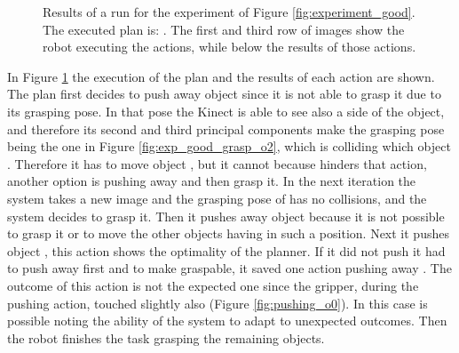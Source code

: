\begin{figure}
\caption{Results of a run for the experiment of Figure \ref{fig:experiment_good}. The executed plan is:  
. The first and third row of images show the robot executing the actions, while below the results of those actions.}\label{fig:execution_experiment}
\end{figure}

In Figure \ref{fig:execution_experiment} the execution of the plan and the results of each action are shown. The plan first decides to push away object  since it is not able to grasp it due to its grasping pose. In that pose the Kinect is able to see also a side of the object, and therefore its second and third principal components make the grasping pose being the one in Figure \ref{fig:exp_good_grasp_o2}, which is colliding which object . Therefore it has to move object , but it cannot because  hinders that action, another option is pushing away  and then grasp it. In the next iteration the system takes a new image and the grasping pose of  has no collisions, and the system decides to grasp it. Then it pushes away object  because it is not possible to grasp it or to move the other objects having  in such a position. Next it pushes object , this action shows the optimality of the planner. If it did not push  it had to push away first  and  to make  graspable, it saved one action pushing away . The outcome of this action is not the expected one since the gripper, during the pushing action, touched slightly also  (Figure \ref{fig:pushing_o0}). In this case is possible noting the ability of the system to adapt to unexpected outcomes. Then the robot finishes the task grasping the remaining objects.



